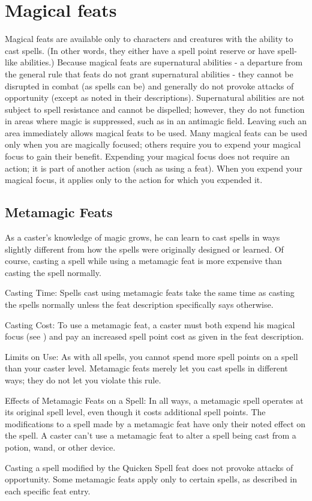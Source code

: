 \section{Magical feats}

Magical feats are available only to characters and creatures with the ability to cast spells. 
(In other words, they either have a spell point reserve or have spell-like abilities.)
Because magical feats are supernatural abilities - a departure from the general rule that feats do not grant supernatural abilities - 
they cannot be disrupted in combat (as spells can be) and generally do not provoke attacks of opportunity (except as noted in their descriptions). 
Supernatural abilities are not subject to spell resistance and cannot be dispelled; however, they do not function in areas where magic is suppressed, 
such as in an antimagic field. Leaving such an area immediately allows magical feats to be used.
Many magical feats can be used only when you are magically focused; others require you to expend your magical focus to gain their benefit. 
Expending your magical focus does not require an action; it is part of another action (such as using a feat). 
When you expend your magical focus, it applies only to the action for which you expended it.

\subsection{Metamagic Feats}
As a caster's knowledge of magic grows, he can learn to cast spells in ways slightly different from how the spells were originally designed or learned. 
Of course, casting a spell while using a metamagic feat is more expensive than casting the spell normally.
\begin{list}{}{\leftmargin=1em}
\item Casting Time:
Spells cast using metamagic feats take the same time as casting the spells normally unless the feat description specifically says otherwise.
\item Casting Cost:
To use a metamagic feat, a caster must both expend his magical focus (see ) 
and pay an increased spell point cost as given in the feat description.
\item Limits on Use: 
As with all spells, you cannot spend more spell points on a spell than your caster level. 
Metamagic feats merely let you cast spells in different ways; they do not let you violate this rule. 
\item Effects of Metamagic Feats on a Spell: 
In all ways, a metamagic spell operates at its original spell level, even though it costs additional spell points. 
The modifications to a spell made by a metamagic feat have only their noted effect on the spell. 
A caster can't use a metamagic feat to alter a spell being cast from a potion, wand, or other device.
\end{list}
Casting a spell modified by the Quicken Spell feat does not provoke attacks of opportunity.
Some metamagic feats apply only to certain spells, as described in each specific feat entry.

